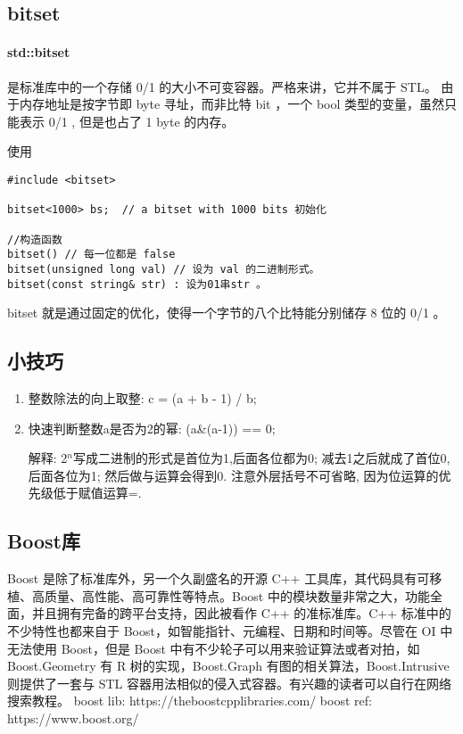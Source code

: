 \documentclass[UTF8]{ctexart}
\begin{document}
\subsection{bitset}
\paragraph{std::bitset}
是标准库中的一个存储 0/1 的大小不可变容器。严格来讲，它并不属于 STL。
由于内存地址是按字节即 byte 寻址，而非比特 bit ，一个 bool 类型的变量，虽然只能表示 0/1 , 但是也占了 1 byte 的内存。


使用
\begin{lstlisting}
#include <bitset>

bitset<1000> bs;  // a bitset with 1000 bits 初始化

//构造函数
bitset() // 每一位都是 false 
bitset(unsigned long val) // 设为 val 的二进制形式。
bitset(const string& str) : 设为01串str 。

\end{lstlisting}
bitset 就是通过固定的优化，使得一个字节的八个比特能分别储存 8 位的 0/1 。

\subsection{小技巧}
\begin{enumerate}[(1)]
\item 整数除法的向上取整: c = (a + b - 1) / b;
\item 快速判断整数a是否为2的幂: (a\&(a-1)) == 0;

    解释: 2$^{n}$写成二进制的形式是首位为1,后面各位都为0; 减去1之后就成了首位0, 后面各位为1; 然后做与运算会得到0. 注意外层括号不可省略, 因为位运算的优先级低于赋值运算=.

\end{enumerate}


\subsection{Boost库}
Boost 是除了标准库外，另一个久副盛名的开源 C++ 工具库，其代码具有可移植、高质量、高性能、高可靠性等特点。Boost 中的模块数量非常之大，功能全面，并且拥有完备的跨平台支持，因此被看作 C++ 的准标准库。C++ 标准中的不少特性也都来自于 Boost，如智能指针、元编程、日期和时间等。尽管在 OI 中无法使用 Boost，但是 Boost 中有不少轮子可以用来验证算法或者对拍，如 Boost.Geometry 有 R 树的实现，Boost.Graph 有图的相关算法，Boost.Intrusive 则提供了一套与 STL 容器用法相似的侵入式容器。有兴趣的读者可以自行在网络搜索教程。
boost lib: https://theboostcpplibraries.com/
boost ref: https://www.boost.org/
\end{document}
